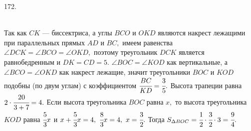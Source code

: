 172. \begin{figure}[ht!]
\end{figure}\\
Так как $CK$ --- биссектриса, а углы $BCO$ и $OKD$ являются накрест лежащими при параллельных прямых $AD$ и $BC,$ имеем равенства $\angle DCK=\angle BCO=\angle OKD,$ поэтому треугольник $DCK$ является равнобедренным и $DK=CD=5.$ $\angle BOC=\angle KOD$ как вертикальные, а $\angle BCO=\angle OKD$ как накрест лежащие, значит треугольники $BOC$ и $KOD$ подобны (по двум углам) с коэффициентом $\cfrac{BC}{KD}=\cfrac{3}{5}.$ Высота трапеции равна $2\cdot\cfrac{20}{3+7}=4.$ Если высота треугольника $BOC$ равна $x,$ то высота треугольника $KOD$ равна $\cfrac{5}{3}x$ и $x+\cfrac{5}{3}x=4,\ \cfrac{8}{3} x=4,\ x=\cfrac{3}{2}.$ Тогда $S_{\Delta BOC}=\cfrac{1}{2}\cdot\cfrac{3}{2}\cdot3=\cfrac{9}{4}.$\newpage\noindent

